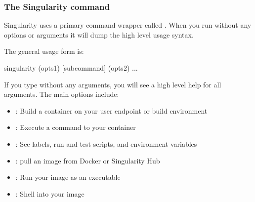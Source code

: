 \documentclass[letterpaper,10pt,english]{sphinxmanual}
\begin{document}
\subsubsection{The Singularity command}
\label{\detokenize{appendix:the-singularity-command}}\label{\detokenize{appendix:sec-commandlineinterface}}
Singularity uses a primary command wrapper called . When you run 
without any options or arguments it will dump the high level usage
syntax.

The general usage form is:

%
\begin{sphinxVerbatim}[commandchars=\\\{\}]
\PYGZdl{} singularity (opts1) [subcommand] (opts2) ...
\end{sphinxVerbatim}

If you type  without any arguments, you will see a high
level help for all arguments. The main options include:
\begin{itemize}
\item {} 
 : Build a container on your user endpoint or build environment

\item {} 
 : Execute a command to your container

\item {} 
 : See labels, run and test scripts, and environment variables

\item {} 
 : pull an image from Docker or Singularity Hub

\item {} 
 : Run your image as an executable

\item {} 
 : Shell into your image

\end{itemize}
\end{document}
